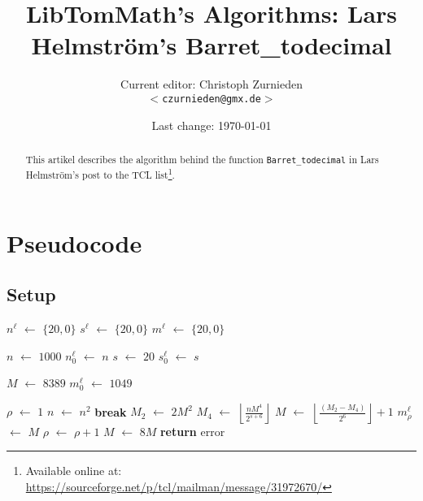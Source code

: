\documentclass[a4paper,10pt]{article}
\newcommand*\Let[2]{\State #1 $\gets$ #2}
\newcommand{\RETURN}{\State \textbf{return} }
\newcommand{\Break}{\State \textbf{break} }
\providecommand{\floor}[1]{\left\lfloor#1\right\rfloor}
\providecommand{\ceil}[1]{\left\lceil#1\right\rceil}
\theoremstyle{plain} %
\theoremstyle{definition}
\theoremstyle{remark}
\newcommand*{\smalltt}[1]{\small\texttt{#1}}
\begin{document}
\title{LibTomMath's Algorithms: Lars Helmstr\"om's Barret\_todecimal}
\author{Current editor: Christoph Zurnieden\\
        \small{\texttt{$<$czurnieden@gmx.de$>$}}}
\date{Last change: \today}
\maketitle

\renewcommand{\ttdefault}{pcr}

\begin{abstract}
This artikel describes the algorithm behind the function \smalltt{Barret\_todecimal} in Lars Helmstr\"om's post to the TCL list\footnote{Available online at: \url{https://sourceforge.net/p/tcl/mailman/message/31972670/}}.
\end{abstract}

\section{Pseudocode}

\subsection{Setup}
\begin{center}
  \begin{algorithmic}[1]
      \Let{$n^\ell$}{$\{20,0\}$}
      \Let{$s^\ell$}{$\{20,0\}$}
      \Let{$m^\ell$}{$\{20,0\}$}

      \Let{$n$}{$1000$}
      \Let{$n^\ell_0$}{$n$}
      \Let{$s$}{$20$}
      \Let{$s^\ell_0$}{$s$}

      \Let{$M$}{$8389$}\Comment{$\ceil{ \left(8 \cdot 2^{20}\right)/1000}$}
      \Let{$m^\ell_0$}{$1049$}\Comment{$\ceil{M/8}$}

      \Let{$\rho$}{$1$}
        \Let{$n$}{$n^2$}
           \Break
        \EndIf
        \CommentInlineMulti{Compute $M = \ceil{\left(2^{2s}\right)/n^2}$}
        \Let{$M_2$}{$2M^2$}
        \Let{$M_4$}{$\floor{\frac{nM^4}{2^{s + 6}}}$}
        \Let{$M$}{$\floor{\frac{\left(M_2 - M_4\right)}{2^6}} + 1$}
        \Let{$m^\ell_\rho$}{$M$}
        \Let{$\rho$}{$\rho + 1$}
        \Let{$M$}{$8M$}
      \EndWhile
         \RETURN error
      \EndIf
      \State {}
    \EndFunction
  \end{algorithmic}
\end{center}
\end{document}
